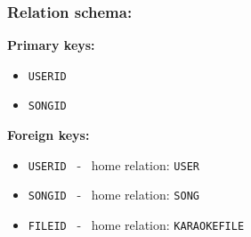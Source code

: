 \documentclass{report}
\begin{document}
\subsubsection*{Relation schema:}
\bigbreak \noindent
\textbf{Primary keys:}
\begin{itemize}
    \item \texttt{USERID}
    \item \texttt{SONGID}
\end{itemize}
\bigbreak \noindent
\textbf{Foreign keys:}
\begin{itemize}
    \item \texttt{USERID} \ - \ home relation: \texttt{USER}
    \item \texttt{SONGID} \ - \ home relation: \texttt{SONG}
    \item \texttt{FILEID} \ - \ home relation: \texttt{KARAOKEFILE}
\end{itemize}
\end{document}

